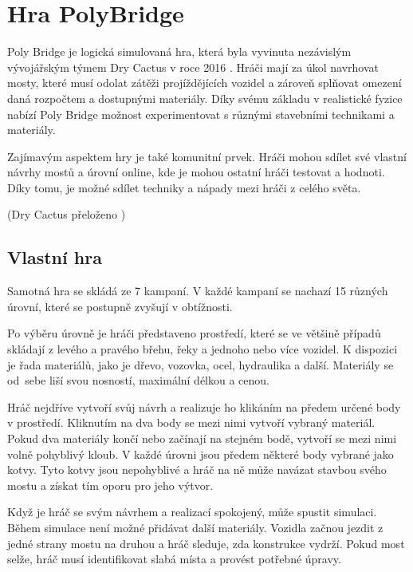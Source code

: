 \chapter{Hra PolyBridge}

Poly Bridge je logická simulovaná hra, která byla vyvinuta nezávislým vývojářským týmem Dry Cactus v roce 2016 \cite{drycactus}. Hráči mají za úkol navrhovat mosty, které musí odolat zátěži projíždějících vozidel a zároveň splňovat omezení daná rozpočtem a dostupnými materiály. Díky svému základu v realistické fyzice nabízí Poly Bridge možnost experimentovat s různými stavebními technikami a materiály.

Zajímavým aspektem hry je také komunitní prvek. Hráči mohou sdílet své vlastní návrhy mostů a úrovní online, kde je mohou ostatní hráči testovat a hodnoti. Díky tomu, je možné sdílet techniky a nápady mezi hráči z celého světa. 

\emph{} (Dry Cactus přeloženo \cite{drycactus})

\section{Vlastní hra}

Samotná hra se skládá ze 7 kampaní. V každé kampaní se nachazí 15 různých úrovní, které se postupně zvyšují v obtížnosti.

Po výběru úrovně je hráči představeno prostředí, které se ve většině případů skládají z levého a pravého břehu, řeky a jednoho nebo více vozidel. K dispozici je řada materiálů, jako je dřevo, vozovka, ocel, hydraulika a další. Materiály se od~sebe liší svou nosností, maximální délkou a cenou.

Hráč nejdříve vytvoří svůj návrh a realizuje ho klikáním na předem určené body v prostředí. Kliknutím na dva body se mezi nimi vytvoří vybraný materiál. Pokud dva materiály končí nebo začínají na stejném bodě, vytvoří se mezi nimi volně pohyblivý kloub. V každé úrovni jsou předem některé body vybrané jako kotvy. Tyto kotvy jsou nepohyblivé a hráč na ně může navázat stavbou svého mostu a získat tím oporu pro jeho výtvor.

Když je hráč se svým návrhem a realizací spokojený, může spustit simulaci. Během simulace není možné přidávat další materiály. Vozidla začnou jezdit z jedné strany mostu na druhou a hráč sleduje, zda konstrukce vydrží. Pokud most selže, hráč musí identifikovat slabá místa a provést potřebné úpravy.

